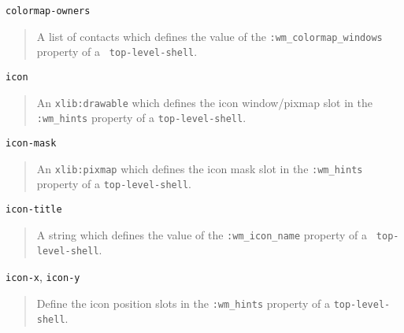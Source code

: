 \begin{flushright} \parbox[t]{6.125in}{
{\tt colormap-owners}
\begin{quote}
A list of contacts which defines the value of the
{\tt :wm\_colormap\_windows} property of a {\tt
top-level-shell}. 
\end{quote}

}\end{flushright}

\begin{flushright} \parbox[t]{6.125in}{
{\tt icon}
\begin{quote}
An {\tt xlib:drawable} which defines the icon window/pixmap slot in the
{\tt :wm\_hints} property of a {\tt top-level-shell}. 
\end{quote}

}\end{flushright}

\begin{flushright} \parbox[t]{6.125in}{
{\tt icon-mask}
\begin{quote}
An {\tt xlib:pixmap} which defines the icon mask slot in the
{\tt :wm\_hints} property of a {\tt top-level-shell}. 

\end{quote}

}\end{flushright}

\begin{flushright} \parbox[t]{6.125in}{
{\tt icon-title}
\begin{quote}
A string which defines the value of the
{\tt :wm\_icon\_name} property of a {\tt
top-level-shell}. 
\end{quote}

}\end{flushright}

\begin{flushright} \parbox[t]{6.125in}{
{\tt icon-x}, {\tt icon-y}
\begin{quote}
Define the icon position slots in the
{\tt :wm\_hints} property of a {\tt top-level-shell}. 
\end{quote}

}\end{flushright}



